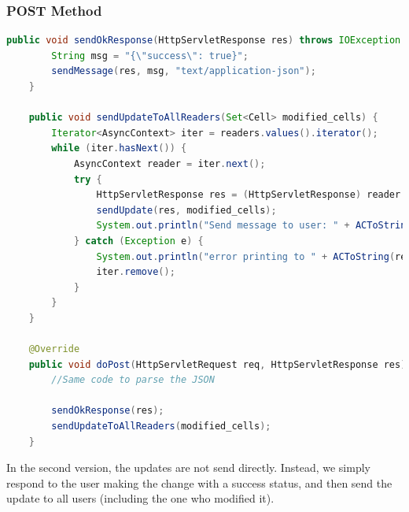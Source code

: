 \documentclass[12pt, a4paper]{article}
\begin{document}
  \subsubsection{POST Method}
  \begin{lstlisting}[language=java, caption={POST route, second version}]
    public void sendOkResponse(HttpServletResponse res) throws IOException {
        String msg = "{\"success\": true}";
        sendMessage(res, msg, "text/application-json");
    }
    
    public void sendUpdateToAllReaders(Set<Cell> modified_cells) {
        Iterator<AsyncContext> iter = readers.values().iterator();
        while (iter.hasNext()) {
            AsyncContext reader = iter.next();
            try {
                HttpServletResponse res = (HttpServletResponse) reader.getResponse();
                sendUpdate(res, modified_cells);
                System.out.println("Send message to user: " + ACToString(reader));
            } catch (Exception e) {
                System.out.println("error printing to " + ACToString(reader));
                iter.remove();
            }
        }
    }
    
    @Override
    public void doPost(HttpServletRequest req, HttpServletResponse res) throws IOException {
        //Same code to parse the JSON

        sendOkResponse(res);
        sendUpdateToAllReaders(modified_cells);
    }
  \end{lstlisting}
  
  In the second version, the updates are not send directly. Instead, we simply respond to the user making the change with a success status, and then send the update to all users (including the one who modified it).
\end{document}
